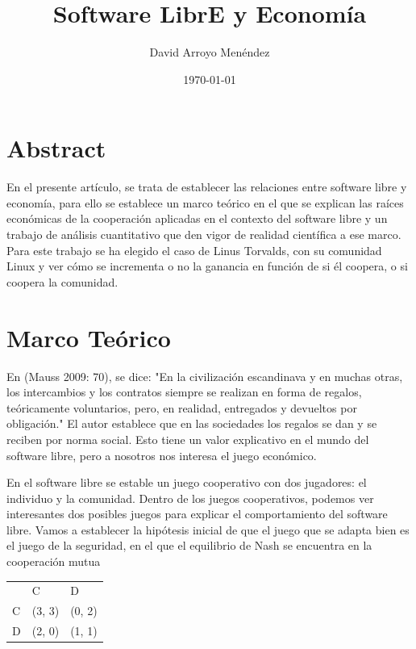 \documentclass[11pt]{article}
\author{David Arroyo Menéndez}
\date{\today}
\title{Software LibrE y Economía}
\begin{document}
\maketitle
\tableofcontents


\section{Abstract}
\label{sec-1}

En el presente artículo, se trata de establecer las relaciones entre
software libre y economía, para ello se establece un marco teórico en
el que se explican las raíces económicas de la cooperación aplicadas
en el contexto del software libre y un trabajo de análisis
cuantitativo que den vigor de realidad científica a ese marco. Para
este trabajo se ha elegido el caso de Linus Torvalds, con su comunidad
Linux y ver cómo se incrementa o no la ganancia en función de si él
coopera, o si coopera la comunidad.

\section{Marco Teórico}
\label{sec-2}

En (Mauss 2009: 70), se dice: "En la civilización escandinava y en
muchas otras, los intercambios y los contratos siempre se realizan en
forma de regalos, teóricamente voluntarios, pero, en realidad,
entregados y devueltos por obligación." El autor establece que en las
sociedades los regalos se dan y se reciben por norma social. Esto
tiene un valor explicativo en el mundo del software libre, pero a
nosotros nos interesa el juego económico. 

En el software libre se estable un juego cooperativo con dos
jugadores: el individuo y la comunidad. Dentro de los juegos
cooperativos, podemos ver interesantes dos posibles juegos para
explicar el comportamiento del software libre. Vamos a establecer la
hipótesis inicial de que el juego que se adapta bien es el juego de la
seguridad, en el que el equilibrio de Nash se encuentra en la
cooperación mutua

\begin{center}
\begin{tabular}{lll}
 & C & D\\
C & (3, 3) & (0, 2)\\
D & (2, 0) & (1, 1)\\
\end{tabular}
\end{center}
\end{document}
